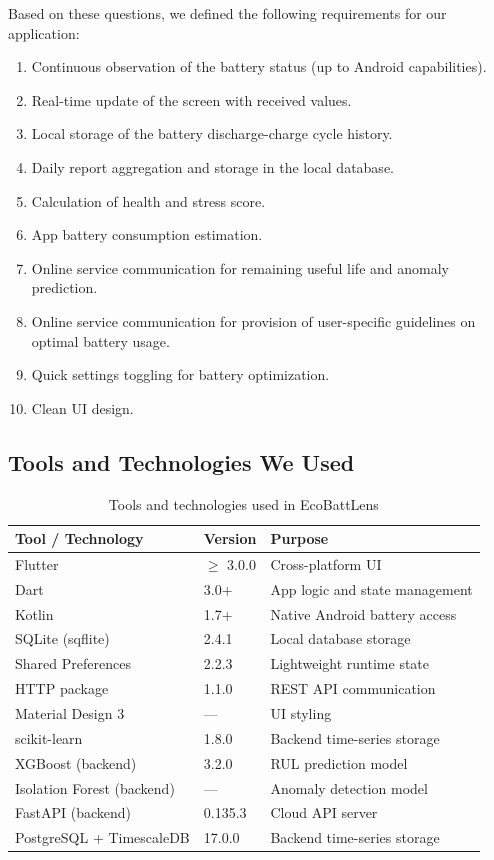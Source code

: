 \documentclass[12pt,a4paper]{report}
\begin{document}
\noindent Based on these questions, we defined the following requirements for our application:

\begin{enumerate}
    \item Continuous observation of the battery status (up to Android capabilities).
    \item Real-time update of the screen with received values.
    \item Local storage of the battery discharge-charge cycle history.
    \item Daily report aggregation and storage in the local database.
    \item Calculation of health and stress score.
    \item App battery consumption estimation.
    \item Online service communication for remaining useful life and anomaly prediction.
    \item Online service communication for provision of user-specific guidelines on optimal battery usage.
    \item Quick settings toggling for battery optimization.
    \item Clean UI design.
\end{enumerate}

\subsection{Tools and Technologies We Used}
\begin{table}[H]
\caption{Tools and technologies used in EcoBattLens}
\centering
\small
\begin{tabular}{lll}
\toprule
\textbf{Tool / Technology} & \textbf{Version} & \textbf{Purpose}\\
\midrule
Flutter        & $\geq$ 3.0.0 & Cross-platform UI\\
Dart           & 3.0+         & App logic and state management\\
Kotlin         & 1.7+         & Native Android battery access\\
SQLite (sqflite) & 2.4.1     & Local database storage\\
Shared Preferences & 2.2.3   & Lightweight runtime state\\
HTTP package   & 1.1.0        & REST API communication\\
Material Design 3 & ---       & UI styling\\
scikit-learn & 1.8.0 & Backend time-series storage\\
XGBoost (backend) & 3.2.0       & RUL prediction model\\
Isolation Forest (backend) & --- & Anomaly detection model\\
FastAPI (backend) & 0.135.3      & Cloud API server\\
PostgreSQL + TimescaleDB & 17.0.0 & Backend time-series storage\\
\bottomrule
\end{tabular}
\end{table}
\end{document}
